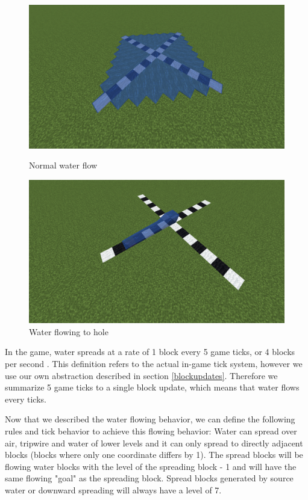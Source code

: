 \begin{figure}[ht]
  \centering
  \begin{minipage}[b]{0.4\textwidth}
    \includegraphics[width=\textwidth]{images/waterflownoair.png}
    \caption{Normal water flow}
    \label{fig:normalflow}
  \end{minipage}
  \hfill
  \begin{minipage}[b]{0.4\textwidth}
    \includegraphics[width=\textwidth]{images/waterflowhole.png}
    \caption{Water flowing to hole}
    \label{fig:holeflow}
  \end{minipage}
\end{figure}
\pagebreak

\noindent In the game, water spreads at a rate of 1 block every 5 game ticks, or 4 blocks per second \cite{minecraftfandom:waterspread}. This definition refers to the actual in-game tick system, however we use our own abstraction described in section \ref{blockupdates}.
Therefore we summarize 5 game ticks to a single block update, which means that water flows every ticks.

\noindent Now that we described the water flowing behavior, we can define the following rules and tick behavior to achieve this flowing behavior: Water can spread over air, tripwire and water of lower levels and it can only spread to directly adjacent blocks (blocks where only one coordinate differs by 1). The spread blocks will be flowing water blocks with the level of the spreading block - 1 and will have the same flowing "goal" as the spreading block. Spread blocks generated by source water or downward spreading will always have a level of 7.

